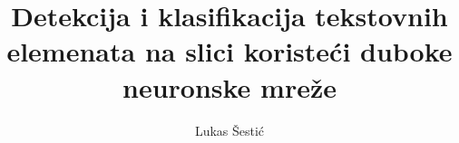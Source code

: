 \documentclass[utf8, zavrsni]{fer}
\begin{document}
\title{Detekcija i klasifikacija tekstovnih elemenata na slici koristeći duboke neuronske mreže}
\author{Lukas Šestić}
\maketitle
\end{document}
